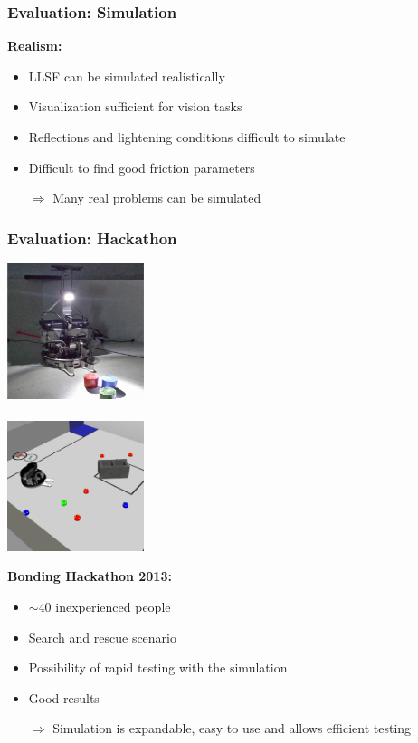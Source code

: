 \documentclass[]{beamer}
\begin{document}
\begin{frame}
  \frametitle{Evaluation: Simulation}
  \textbf{\large Realism:}\\
  \begin{itemize}
  \item LLSF can be simulated realistically
  \item Visualization sufficient for vision tasks %
  \item Reflections and lightening conditions difficult to simulate %
  \item Difficult to find good friction parameters
  \item[$\Rightarrow$] Many real problems can be simulated
  \end{itemize}
\end{frame}

\begin{frame}
  \frametitle{Evaluation: Hackathon}
  \begin{multicols}{2}
    \center
    \includegraphics[width=0.3\textwidth]{../pics/hackathon_real_de}\\
    \hspace{0.5cm}\\
    \includegraphics[width=0.3\textwidth]{../pics/hackathon_sim}\\
    \raggedright
    \textbf{\large Bonding Hackathon 2013:}
    \begin{itemize}
    \item $\sim 40$ inexperienced people 
    \item Search and rescue scenario
    \item Possibility of rapid testing with the simulation
    \item Good results
    \item[$\Rightarrow$] Simulation is expandable, easy to use and allows efficient testing
    \end{itemize}
  \end{multicols}
\end{frame}
\end{document}
